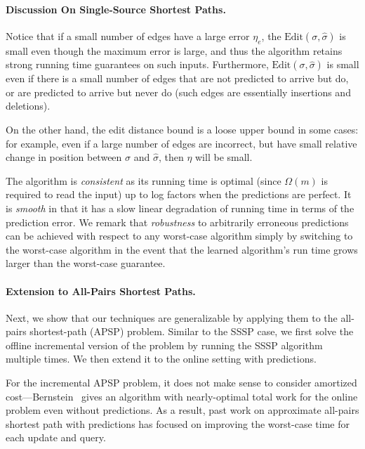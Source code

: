 \documentclass[11pt]{article}
\begin{document}
\paragraph{Discussion On Single-Source Shortest Paths.}   Notice that if a small number of edges have a large error $\eta_e$, the $\text{Edit}(\sigma,\hat{\sigma})$ is small even though the maximum error is large, and thus the algorithm retains strong running time guarantees on such inputs.   
Furthermore, $\text{Edit}(\sigma,\hat{\sigma})$ is small even if there is a small number of edges that are not predicted to arrive but do, or are predicted to arrive but never do (such edges are essentially insertions and deletions).  

On the other hand, the edit distance bound is a loose upper bound in some cases: for example, even if a large number of edges are incorrect, but have small relative change in position between $\sigma$ and $\hat{\sigma}$, then $\eta$ will be small. 

The algorithm is \emph{consistent} as its running time is optimal (since $\Omega(m)$ is required to read the input) up to log factors when the predictions are perfect.
It is \emph{smooth} in that it has a slow linear degradation of running time in terms of the prediction error.  We remark that \emph{robustness} to arbitrarily erroneous predictions can be achieved with respect to any worst-case algorithm simply by switching to the worst-case algorithm in the event that the learned algorithm's run time grows larger than the worst-case guarantee. 

\paragraph{Extension to All-Pairs  Shortest Paths.}  Next, we show that our techniques are generalizable by applying them to the all-pairs shortest-path (APSP) problem.  Similar to the SSSP case, we first solve the offline incremental version of the problem by running the SSSP algorithm multiple times.  We then extend it to the online setting with predictions. 

For the incremental APSP problem, it does not make sense to consider amortized cost---Bernstein~\cite{bernstein2016maintaining} gives an algorithm with nearly-optimal total work for the online problem even without predictions.  As a result, past work on approximate all-pairs shortest path with predictions has focused on improving the worst-case time for each update and query.  
\end{document}
